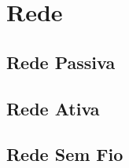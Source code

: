 \chapter{Rede}

\section{Rede Passiva}

\newpage
\section{Rede Ativa}

\newpage
\section{Rede Sem Fio}
